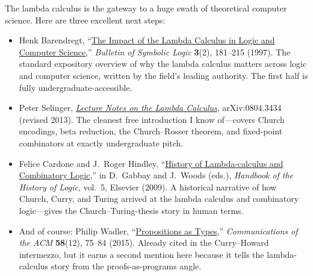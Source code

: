 \documentclass[11pt]{article}
\begin{document}
The lambda calculus is the gateway to a huge swath of theoretical computer science. Here are three excellent next steps:

\begin{itemize}
  \item Henk Barendregt, ``\href{https://www.cambridge.org/core/journals/bulletin-of-symbolic-logic/article/abs/impact-of-the-lambda-calculus-in-logic-and-computer-science/7B63F923EC566E549B093911BFC7470E}{The Impact of the Lambda Calculus in Logic and Computer Science},'' \emph{Bulletin of Symbolic Logic} \textbf{3}(2), 181--215 (1997). The standard expository overview of why the lambda calculus matters across logic and computer science, written by the field's leading authority. The first half is fully undergraduate-accessible.
  \item Peter Selinger, \emph{\href{https://arxiv.org/abs/0804.3434}{Lecture Notes on the Lambda Calculus}}, arXiv:0804.3434 (revised 2013). The cleanest free introduction I know of---covers Church encodings, beta reduction, the Church--Rosser theorem, and fixed-point combinators at exactly undergraduate pitch.
  \item Felice Cardone and J.~Roger Hindley, ``\href{http://www.di.unito.it/~felice/pdf/lambdacomb.pdf}{History of Lambda-calculus and Combinatory Logic},'' in D.~Gabbay and J.~Woods (eds.), \emph{Handbook of the History of Logic}, vol.~5, Elsevier (2009). A historical narrative of how Church, Curry, and Turing arrived at the lambda calculus and combinatory logic---gives the Church--Turing-thesis story in human terms.
  \item And of course: Philip Wadler, ``\href{https://homepages.inf.ed.ac.uk/wadler/papers/propositions-as-types/propositions-as-types.pdf}{Propositions as Types},'' \emph{Communications of the ACM} \textbf{58}(12), 75--84 (2015). Already cited in the Curry--Howard intermezzo, but it earns a second mention here because it tells the lambda-calculus story from the proofs-as-programs angle.
\end{itemize}
\end{document}
